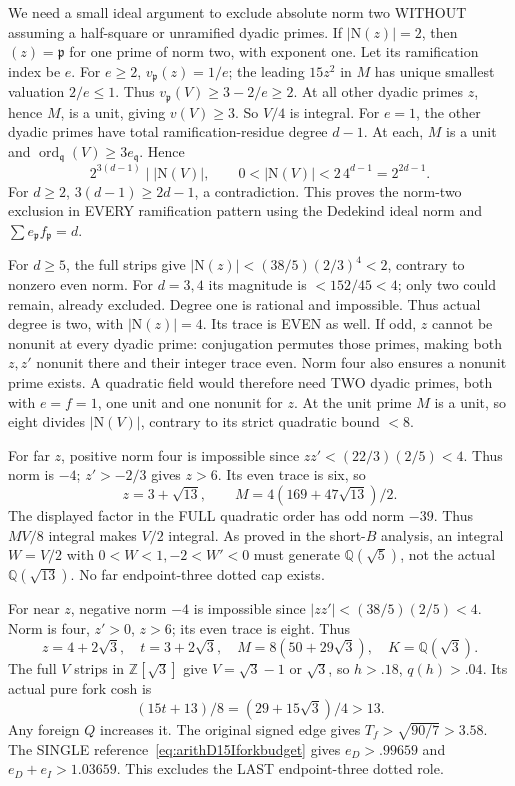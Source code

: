 \documentclass[11pt]{article}
\begin{document}
We need a small ideal argument to exclude absolute
norm two WITHOUT assuming a half-square or unramified
dyadic primes.
If \(|\mathrm N(z)|=2\), then \((z)=\mathfrak p\)
for one prime of norm two, with exponent one.
Let its ramification index be \(e\).
For \(e\ge2\), \(v_{\mathfrak p}(z)=1/e\);
the leading \(15z^2\) in \(M\) has unique smallest
valuation \(2/e\le1\).
Thus \(v_{\mathfrak p}(V)\ge3-2/e\ge2\).
At all other dyadic primes \(z\), hence \(M\),
is a unit, giving \(v(V)\ge3\).
So \(V/4\) is integral.
For \(e=1\), the other dyadic primes have
total ramification-residue degree \(d-1\).
At each, \(M\) is a unit and
\(\operatorname{ord}_{\mathfrak q}(V)\ge3e_{\mathfrak q}\).
Hence
\[
             2^{3(d-1)}\mid |\mathrm N(V)|,
 \qquad 0<|\mathrm N(V)|<2\,4^{d-1}=2^{2d-1}.
\]
For \(d\ge2\), \(3(d-1)\ge2d-1\), a contradiction.
This proves the norm-two exclusion in EVERY
ramification pattern using the Dedekind ideal norm
and \(\sum e_{\mathfrak p}f_{\mathfrak p}=d\).

For \(d\ge5\), the full strips give
\(|\mathrm N(z)|<(38/5)(2/3)^4<2\),
contrary to nonzero even norm.
For \(d=3,4\) its magnitude is \(<152/45<4\);
only two could remain, already excluded.
Degree one is rational and impossible.
Thus actual degree is two, with
\(|\mathrm N(z)|=4\).
Its trace is EVEN as well.
If odd, \(z\) cannot be nonunit at every dyadic
prime: conjugation permutes those primes, making
both \(z,z'\) nonunit there and their integer
trace even.
Norm four also ensures a nonunit prime exists.
A quadratic field would therefore need TWO
dyadic primes, both with \(e=f=1\), one unit
and one nonunit for \(z\).
At the unit prime \(M\) is a unit, so eight
divides \(|\mathrm N(V)|\), contrary to its strict
quadratic bound \(<8\).

For far \(z\), positive norm four is impossible
since \(zz'<(22/3)(2/5)<4\).
Thus norm is \(-4\); \(z'>-2/3\) gives \(z>6\).
Its even trace is six, so
\[
 z=3+\sqrt{13},\qquad
 M=4(169+47\sqrt{13})/2 .
\]
The displayed factor in the FULL quadratic order
has odd norm \(-39\).
Thus \(MV/8\) integral makes \(V/2\) integral.
As proved in the short-\(B\) analysis, an integral
\(W=V/2\) with \(0<W<1,-2<W'<0\) must
generate \(\mathbb Q(\sqrt5)\), not the actual
\(\mathbb Q(\sqrt{13})\).
No far endpoint-three dotted cap exists.

For near \(z\), negative norm \(-4\) is impossible
since \(|zz'|<(38/5)(2/5)<4\).
Norm is four, \(z'>0\), \(z>6\);
its even trace is eight.
Thus
\[
 z=4+2\sqrt3,\quad t=3+2\sqrt3,\quad
 M=8(50+29\sqrt3),\quad K=\mathbb Q(\sqrt3).
\]
The full \(V\) strips in \(\mathbb Z[\sqrt3]\)
give \(V=\sqrt3-1\) or \(\sqrt3\), so
\(h>.18\), \(q(h)>.04\).
Its actual pure fork cosh is
\[
                  (15t+13)/8=(29+15\sqrt3)/4>13 .
\]
Any foreign \(Q\) increases it.
The original signed edge gives
\(T_f>\sqrt{90/7}>3.58\).
The SINGLE reference~\eqref{eq:arithD15Iforkbudget}
gives \(e_D>.99659\) and
\(e_D+e_I>1.03659\).
This excludes the LAST endpoint-three dotted role.
\end{document}
